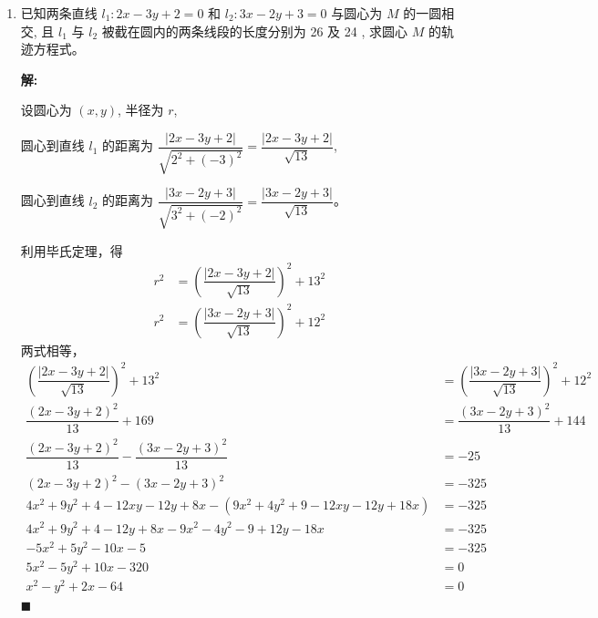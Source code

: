 \documentclass[10pt]{article}
\newcommand{\sol}{\textbf{解:} }
\begin{document}
\begin{enumerate}[leftmargin=*]
        \newpage
  \item 已知两条直线 $l_{1}: 2 x-3 y+2=0$ 和 $l_{2}: 3 x-2 y+3=0$ 与圆心为 $M$ 的一圆相交, 且 $l_{1}$ 与 $l_{2}$ 被截在圆内的两条线段的长度分别为 26 及 24 , 求圆心 $M$ 的轨迹方程式。

        \sol{}

        设圆心为 $(x, y)$, 半径为 $r$,

        圆心到直线 $l_{1}$ 的距离为 $\dfrac{|2x-3y+2|}{\sqrt{2^{2}+(-3)^{2}}} = \dfrac{|2x-3y+2|}{\sqrt{13}}$,

        圆心到直线 $l_{2}$ 的距离为 $\dfrac{|3x-2y+3|}{\sqrt{3^{2}+(-2)^{2}}} = \dfrac{|3x-2y+3|}{\sqrt{13}}$。

        利用毕氏定理，得
        \begin{align*}
          r^{2} & = \left(\dfrac{|2x-3y+2|}{\sqrt{13}}\right)^{2} + 13^{2} \\
          r^2   & = \left(\dfrac{|3x-2y+3|}{\sqrt{13}}\right)^{2} + 12^{2}
        \end{align*}
        两式相等，
        \begin{align*}
          \left(\dfrac{|2x-3y+2|}{\sqrt{13}}\right)^{2} + 13^{2}                           & = \left(\dfrac{|3x-2y+3|}{\sqrt{13}}\right)^{2} + 12^{2} \\
          \dfrac{(2x-3y+2)^{2}}{13} + 169                                                  & = \dfrac{(3x-2y+3)^{2}}{13} + 144                        \\
          \dfrac{(2x-3y+2)^{2}}{13} - \dfrac{(3x-2y+3)^{2}}{13}                            & = -25                                                    \\
          (2x-3y+2)^{2} - (3x-2y+3)^{2}                                                    & = -325                                                   \\
          4x^{2} + 9y^{2} + 4 - 12xy - 12y + 8x - (9x^{2} + 4y^{2} + 9 - 12xy - 12y + 18x) & = -325                                                   \\
          4x^{2} + 9y^{2} + 4 - 12y + 8x - 9x^{2} - 4y^{2} - 9 + 12y - 18x                 & = -325                                                   \\
          -5x^{2} + 5y^{2} - 10x - 5                                                       & = -325                                                   \\
          5x^{2} - 5y^{2} + 10x - 320                                                      & = 0                                                      \\
          x^{2} - y^{2} + 2x - 64                                                          & = 0
        \end{align*} \hfill$\blacksquare$


\end{enumerate}
\end{document}
